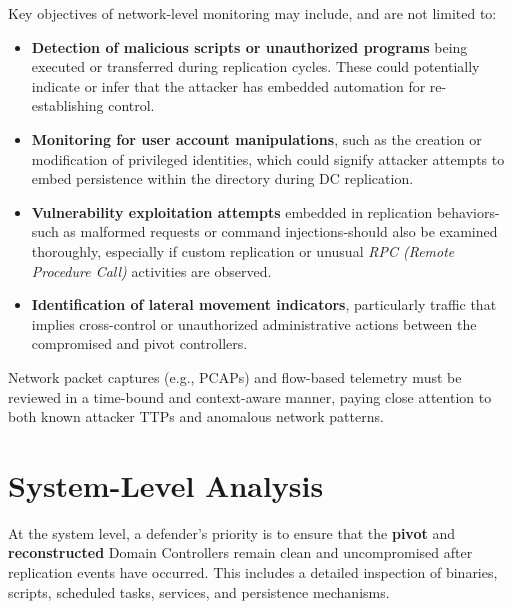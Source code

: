 Key objectives of network-level monitoring may include, and are not limited to:
\begin{itemize}
    \item \textbf{Detection of malicious scripts or unauthorized programs} being executed or transferred during replication cycles. These could potentially indicate or infer that the attacker has embedded automation for re-establishing control.
    \item \textbf{Monitoring for user account manipulations}, such as the creation or modification of privileged identities, which could signify attacker attempts to embed persistence within the directory during DC replication.
    \item \textbf{Vulnerability exploitation attempts} embedded in replication behaviors-such as malformed requests or command injections-should also be examined thoroughly, especially if custom replication or unusual \textit{RPC (Remote Procedure Call)} activities are observed.
    \item \textbf{Identification of lateral movement indicators}, particularly traffic that implies cross-control or unauthorized administrative actions between the compromised and pivot controllers.
\end{itemize}

Network packet captures (e.g., PCAPs) and flow-based telemetry must be reviewed in a time-bound and context-aware manner, paying close attention to both known attacker TTPs and anomalous network patterns.

\section{System-Level Analysis}
At the system level, a defender's priority is to ensure that the \textbf{pivot} and \textbf{reconstructed} Domain Controllers remain clean and uncompromised after replication events have occurred. This includes a detailed inspection of binaries, scripts, scheduled tasks, services, and persistence mechanisms.

